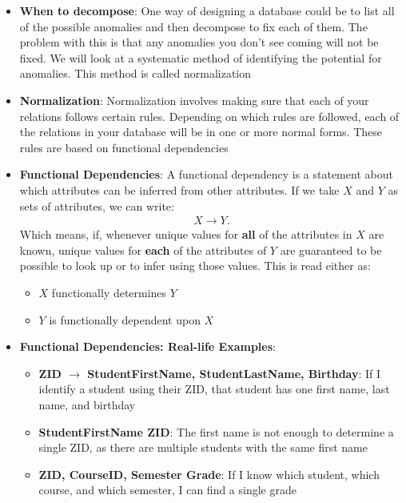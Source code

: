 \documentclass{report}
\begin{document}
\begin{itemize}
\begin{center}
            \end{center}
        \item \textbf{When to decompose}: One way of designing a database could be to list all of the possible anomalies and then decompose to fix each of them. The problem with this is that any anomalies you don’t see coming will not be fixed.
            \bigbreak \noindent 
            We will look at a systematic method of identifying the potential for anomalies. This method is called normalization
        \item \textbf{Normalization}: Normalization involves making sure that each of your relations follows certain rules. Depending on which rules are followed, each of the relations in your database will be in one or more normal forms. These rules are based on functional dependencies
        \item \textbf{Functional Dependencies}: A functional dependency is a statement about which attributes can be inferred from other attributes. If we take $X$ and $Y$ as sets of attributes, we can write:
            \begin{align*}
                X \to Y
            .\end{align*}
            \bigbreak \noindent 
            Which means, if, whenever unique values for \textbf{all} of the attributes in $X$ are known, unique values for \textbf{each} of the attributes of $Y$ are guaranteed to be possible to look up or to infer using those values.
            \bigbreak \noindent 
            This is read either as:
            \begin{itemize}
                \item $X$ functionally determines $Y$
                \item $Y$ is functionally dependent upon $X$
            \end{itemize}
        \item \textbf{Functional Dependencies: Real-life Examples}: 
            \begin{itemize}
                \item \textbf{ZID $\to$ StudentFirstName, StudentLastName, Birthday}: If I identify a student using their ZID, that student has one first name, last name, and birthday
                \item \textbf{StudentFirstName \not \to ZID}: The first name is not enough to determine a single ZID, as there are multiple students with the same first name
                \item \textbf{ZID, CourseID, Semester \to Grade}: If I know which student, which course, and which semester, I can find a single grade

\end{itemize}
\end{itemize}
\end{document}
